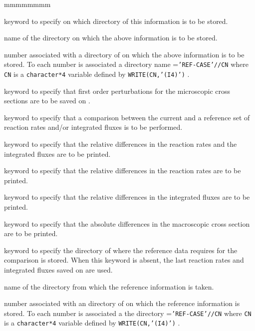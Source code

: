 \begin{ListeDeDescription}{mmmmmmmm}
\item[\moc{ON}] keyword to specify on which directory of  this
information is to be stored.

\item[\dusa{DIRN}] name of the directory on which the above information is to
be stored.

\item[\dusa{idirn}] number associated with a directory of  on
which the above information is to be stored. To each number  is
associated a directory name ={\tt 'REF-CASE'//CN} where {\tt CN} is a
{\tt character*4} variable defined by {\tt WRITE(CN,'(I4)')} .

\item[\moc{PERT}] keyword to specify that first order perturbations for 
the microscopic cross sections are to be saved on . 

\item[\moc{STAT}] keyword to specify that a comparison between the current and
a reference set of reaction rates and/or integrated fluxes is to be performed. 

\item[\moc{ALL}] keyword to specify that the relative differences in the
reaction rates and the integrated fluxes are to be printed.

\item[\moc{RATE}] keyword to specify that the relative differences in the
reaction rates are to be printed.

\item[\moc{FLUX}] keyword to specify that the relative differences in the
integrated fluxes are to be printed. 

\item[\moc{DELS}] keyword to specify that the absolute differences in the
macroscopic cross section are to be printed.

\item[\moc{REFE}] keyword to specify the directory of  where the
reference data requires for the comparison is stored. When this keyword is
absent, the last reaction rates and integrated fluxes saved on  are
used.

\item[\dusa{DIRO}] name of the directory from which the reference information
is taken.

\item[\dusa{idiro}] number associated with an directory of  on
which the reference information is  stored. To each number  is
associated a the directory  ={\tt 'REF-CASE'//CN} where {\tt CN} is a
{\tt character*4} variable defined by {\tt WRITE(CN,'(I4)')} . 


\end{ListeDeDescription}
